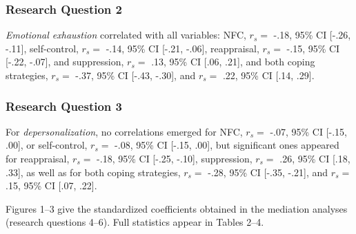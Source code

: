 \documentclass[
  english,
  man]{apa6}
\begin{document}
\subsubsection{Research Question 2}\label{research-question-2}

\emph{Emotional exhaustion} correlated with all variables: NFC, \(r_{s}=\) -.18, 95\% CI {[}-.26, -.11{]}, self-control, \(r_{s}=\) -.14, 95\% CI {[}-.21, -.06{]}, reappraisal, \(r_{s}=\) -.15, 95\% CI {[}-.22, -.07{]}, and suppression, \(r_{s}=\) .13, 95\% CI {[}.06, .21{]}, and both coping strategies, \(r_{s}=\) -.37, 95\% CI {[}-.43, -.30{]}, and \(r_{s}=\) .22, 95\% CI {[}.14, .29{]}.

\subsubsection{Research Question 3}\label{research-question-3}

For \emph{depersonalization}, no correlations emerged for NFC, \(r_{s}=\) -.07, 95\% CI {[}-.15, .00{]}, or self-control, \(r_{s}=\) -.08, 95\% CI {[}-.15, .00{]}, but significant ones appeared for reappraisal, \(r_{s}=\) -.18, 95\% CI {[}-.25, -.10{]}, suppression, \(r_{s}=\) .26, 95\% CI {[}.18, .33{]}, as well as for both coping strategies, \(r_{s}=\) -.28, 95\% CI {[}-.35, -.21{]}, and \(r_{s}=\) .15, 95\% CI {[}.07, .22{]}.

Figures 1--3 give the standardized coefficients obtained in the mediation analyses (research questions 4--6). Full statistics appear in Tables 2--4.
\end{document}
